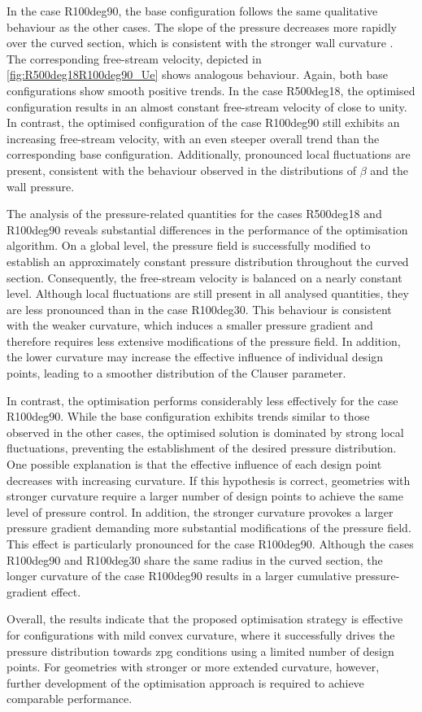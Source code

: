 In the case R100deg90, the base configuration follows the same qualitative behaviour as the other cases. 
The slope of the pressure  decreases more rapidly over the curved section, which is consistent with the stronger wall curvature \citep{so_experiment_1973}.
The corresponding free-stream velocity, depicted in \autoref{fig:R500deg18R100deg90_Ue} shows analogous behaviour.
Again, both base configurations show smooth positive trends.
In the case R500deg18, the optimised configuration results in an almost constant free-stream velocity of close to unity.
In contrast, the optimised configuration of the case R100deg90 still exhibits an increasing free-stream velocity, with an even steeper overall trend than the corresponding base configuration.
Additionally, pronounced local fluctuations are present, consistent with the behaviour observed in the distributions of $\beta$ and the wall pressure.




The analysis of the pressure-related quantities for the cases R500deg18 and R100deg90 reveals substantial differences in the performance of the optimisation algorithm. 
On a global level, the pressure field is successfully modified to establish an approximately constant pressure distribution throughout the curved section. 
Consequently, the free-stream velocity is balanced on a nearly constant level.
Although local fluctuations are still present in all analysed quantities, they are less pronounced than in the case R100deg30.
This behaviour is consistent with the weaker curvature, which induces a smaller pressure gradient and therefore requires less extensive modifications of the pressure field.
In addition, the lower curvature may increase the effective influence of individual design points, leading to a smoother distribution of the Clauser parameter.

In contrast, the optimisation performs considerably less effectively for the case R100deg90.
While the base configuration exhibits trends similar to those observed in the other cases, the optimised solution is dominated by strong local fluctuations, preventing the establishment of the desired pressure distribution.
One possible explanation is that the effective influence of each design point decreases with increasing curvature.
If this hypothesis is correct, geometries with stronger curvature require a larger number of design points to achieve the same level of pressure control. 
In addition, the stronger curvature provokes a larger pressure gradient demanding more substantial modifications of the pressure field.
This effect is particularly pronounced for the case R100deg90.
Although the cases R100deg90 and R100deg30 share the same radius in the curved section, the longer curvature of the case R100deg90 results in a larger cumulative pressure-gradient effect.


Overall, the results indicate that the proposed optimisation strategy is effective for configurations with mild convex curvature, where it successfully drives the pressure distribution towards \acrshort{zpg} conditions using a limited number of design points.
For geometries with stronger or more extended curvature, however, further development of the optimisation approach is required to achieve comparable performance.

